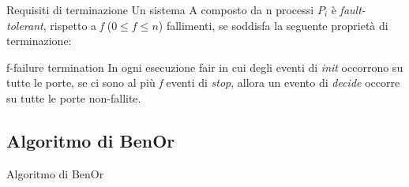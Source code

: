 \documentclass{beamer}
\begin{document}
\begin{frame}{Requisiti di terminazione}
    Un sistema A composto da n processi $P_{i}$ è \textit{fault-tolerant}, rispetto a \textit{f} ($0 \leq f \leq n$) fallimenti, se soddisfa la seguente proprietà di terminazione: 
    \begin{block}{f-failure termination}
    In ogni esecuzione fair in cui degli eventi di \textit{init} occorrono su tutte le porte, se ci sono al più \textit{f} eventi di \textit{stop}, allora un evento di \textit{decide} occorre su tutte le porte non-fallite. 
    \end{block}
\end{frame}

\subsection{Algoritmo di BenOr}
\begin{frame}{Algoritmo di BenOr}
    
\end{frame}


\end{document}
